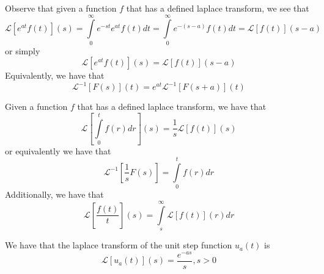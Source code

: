 \documentclass[12pt, a4paper, oneside, openright, titlepage]{book}
\begin{document}


\begin{props}
        Observe that given a function $f$ that has a defined laplace transform, we see that \begin{equation}
                \mathcal{L}[e^{at}f(t)](s) = \int\limits_0^{\infty}e^{-st}e^{at}f(t)dt = \int\limits_0^{\infty}e^{-(s-a)}f(t)dt = \mathcal{L}[f(t)](s-a)
        \end{equation}
        or simply \begin{equation}
                \mathcal{L}[e^{at}f(t)](s) = \mathcal{L}[f(t)](s-a)
        \end{equation}
        Equivalently, we have that \begin{equation}
                \mathcal{L}^{-1}[F(s)](t) = e^{at}\mathcal{L}^{-1}[F(s+a)](t)
        \end{equation}
\end{props}




\begin{props}
        Given a function $f$ that has a defined laplace transform, we have that \begin{equation}
                \mathcal{L}\left[\int\limits_0^tf(r)dr\right](s) = \frac{1}{s}\mathcal{L}[f(t)](s)
        \end{equation}
        or equivalently we have that \begin{equation}
                \mathcal{L}^{-1}\left[\frac{1}{s}F(s)\right] = \int\limits_0^tf(r)dr
        \end{equation}
        Additionally, we have that \begin{equation}
                \mathcal{L}\left[\frac{f(t)}{t}\right](s) = \int\limits_s^{\infty}\mathcal{L}[f(t)](r)dr
        \end{equation}
\end{props}




\begin{props}
        We have that the laplace transform of the unit step function $u_a(t)$ is \begin{equation}
                \mathcal{L}[u_a(t)](s) = \frac{e^{-as}}{s}, s > 0
        \end{equation}
\end{props}


\end{document}

